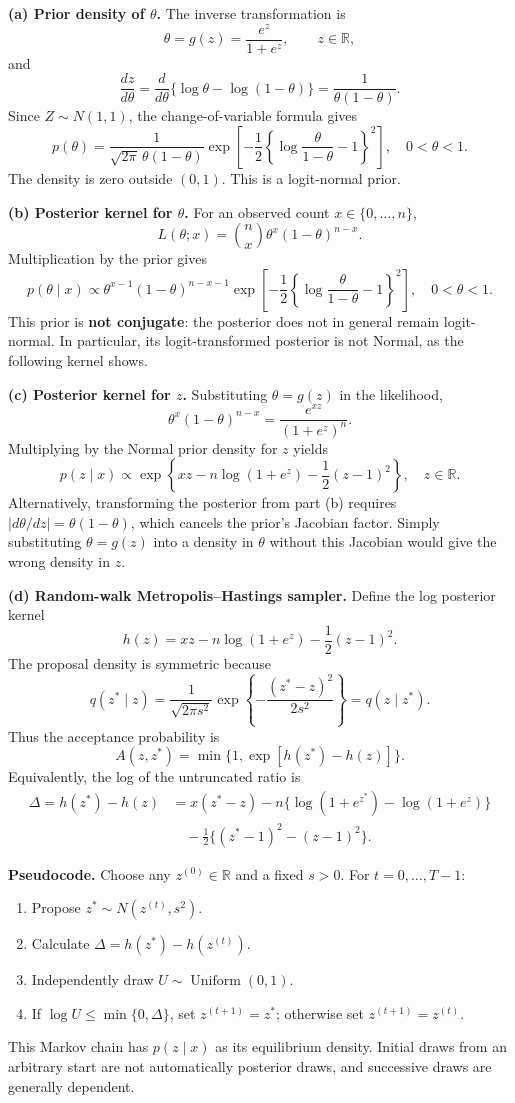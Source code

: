 \documentclass[11pt,a4paper]{article}
\newcommand{\given}{\mathrel{|}}
\begin{document}
\textbf{(a) Prior density of $\theta$.}
The inverse transformation is
\[
\theta=g(z)=\frac{e^z}{1+e^z},\qquad z\in\mathbb R,
\]
and
\[
\frac{dz}{d\theta}
=\frac{d}{d\theta}\{\log\theta-\log(1-\theta)\}
=\frac1{\theta(1-\theta)}.
\]
Since $Z\sim N(1,1)$, the change-of-variable formula gives
\[
\boxed{
p(\theta)
=\frac{1}{\sqrt{2\pi}\,\theta(1-\theta)}
\exp\left[-\frac12\left\{\log\frac{\theta}{1-\theta}-1\right\}^2\right],
\quad 0<\theta<1.
}
\]
The density is zero outside $(0,1)$. This is a logit-normal prior.

\textbf{(b) Posterior kernel for $\theta$.}
For an observed count $x\in\{0,\ldots,n\}$,
\[
L(\theta;x)=\binom nx\theta^x(1-\theta)^{n-x}.
\]
Multiplication by the prior gives
\[
\boxed{
p(\theta\given x)\propto
\theta^{x-1}(1-\theta)^{n-x-1}
\exp\left[-\frac12\left\{\log\frac{\theta}{1-\theta}-1\right\}^2\right],
\quad 0<\theta<1.
}
\]
This prior is \textbf{not conjugate}: the posterior does not in general
remain logit-normal. In particular, its logit-transformed posterior is not
Normal, as the following kernel shows.

\textbf{(c) Posterior kernel for $z$.}
Substituting $\theta=g(z)$ in the likelihood,
\[
\theta^x(1-\theta)^{n-x}
=\frac{e^{xz}}{(1+e^z)^n}.
\]
Multiplying by the Normal prior density for $z$ yields
\[
\boxed{
p(z\given x)\propto
\exp\left\{xz-n\log(1+e^z)-\frac12(z-1)^2\right\},
\quad z\in\mathbb R.
}
\]
Alternatively, transforming the posterior from part (b) requires
$|d\theta/dz|=\theta(1-\theta)$, which cancels the prior's Jacobian factor.
Simply substituting $\theta=g(z)$ into a density in $\theta$ without this
Jacobian would give the wrong density in $z$.

\textbf{(d) Random-walk Metropolis--Hastings sampler.}
Define the log posterior kernel
\[
h(z)=xz-n\log(1+e^z)-\frac12(z-1)^2.
\]
The proposal density is symmetric because
\[
q(z^*\given z)
=\frac1{\sqrt{2\pi s^2}}\exp\left\{-\frac{(z^*-z)^2}{2s^2}\right\}
=q(z\given z^*).
\]
Thus the acceptance probability is
\[
A(z,z^*)=\min\{1,\exp[h(z^*)-h(z)]\}.
\]
Equivalently, the log of the untruncated ratio is
\begin{align*}
\Delta=h(z^*)-h(z)
&=x(z^*-z)-n\{\log(1+e^{z^*})-\log(1+e^z)\}\\
&\quad-\frac12\{(z^*-1)^2-(z-1)^2\}.
\end{align*}

\textbf{Pseudocode.}
Choose any $z^{(0)}\in\mathbb R$ and a fixed $s>0$. For
$t=0,\ldots,T-1$:
\begin{enumerate}[label=\arabic*.]
  \item Propose $z^*\sim N(z^{(t)},s^2)$.
  \item Calculate $\Delta=h(z^*)-h(z^{(t)})$.
  \item Independently draw $U\sim\operatorname{Uniform}(0,1)$.
  \item If $\log U\le\min\{0,\Delta\}$, set $z^{(t+1)}=z^*$;
        otherwise set $z^{(t+1)}=z^{(t)}$.
\end{enumerate}
This Markov chain has $p(z\given x)$ as its equilibrium density. Initial
draws from an arbitrary start are not automatically posterior draws, and
successive draws are generally dependent.
\end{document}
